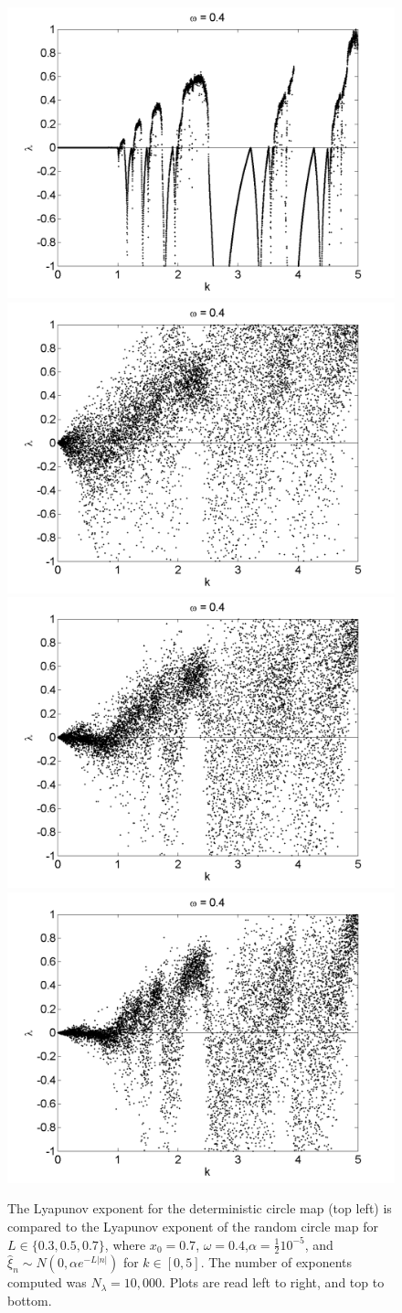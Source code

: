 \begin{figure}[!h]
\caption[Lyapunov exponent in the random circle map (normal distribution) compared to the
deterministic map, varying $k$, $\alpha = \frac{1}{2}10^{-5}$]{The Lyapunov exponent for the deterministic
  circle map (top left) is compared
  to the Lyapunov exponent of the random circle map for $L \in
  \{0.3,0.5,0.7\}$, where $x_0=0.7$, $\omega=0.4$,$\alpha =\frac{1}{2}10^{-5}$, and $\hat{\xi}_n\sim
  N(0,\alpha e^{-L|n|})$ for $k \in [0,5]$. The number of exponents computed was $N_\lambda=10,000$. Plots are read left to right, and top to bottom. }\label{fig:rcirclyap2_n_ha}
\centering
\includegraphics[width=.5\textwidth]{figs/detcirc_n_lyap_10000_w_04_k.png}\hfill
\includegraphics[width=.5\textwidth]{figs/rcirc_n_lyap_halfa10000_L_03_w_04_k.png}\\
\includegraphics[width=.5\textwidth]{figs/rcirc_n_lyap_halfa10000_L_05_w_04_k.png}\hfill
\includegraphics[width=.5\textwidth]{figs/rcirc_n_lyap_halfa10000_L_07_w_04_k.png}\\
\end{figure}

